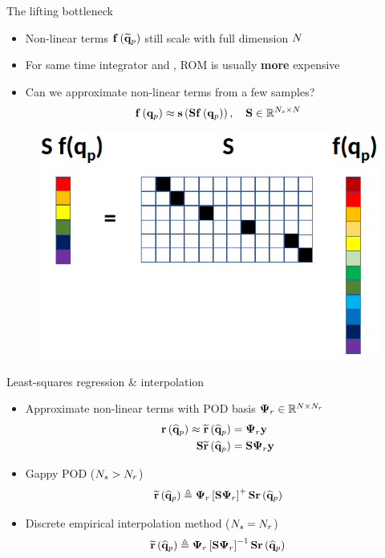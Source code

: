 \documentclass[]{beamer}
\begin{document}
\begin{frame}{The lifting bottleneck}
    \begin{itemize}
		\item Non-linear terms $\mathbf{f} \left(\mathbf{\widetilde{q}}_p\right)$ still scale with full dimension $N$
		\item For same time integrator and \dt, ROM is usually \textbf{more} expensive
		\item Can we approximate non-linear terms from a few samples?
		\begin{equation*}
			\mathbf{f} \left(\mathbf{q}_p\right) \approx \mathbf{s}\left(\mathbf{S} \mathbf{f} \left(\mathbf{q}_p\right)\right), \quad \mathbf{S} \in \mathbb{R}^{N_s \times N}
		\end{equation*}
	\end{itemize}
	\vspace{1em}
	\begin{figure}
		\centering
		\includegraphics[width=0.55\linewidth]{samplingHelperVis.png}
	\end{figure}
\end{frame}

\begin{frame}{Least-squares regression \& interpolation}
    \begin{itemize}
		\item Approximate non-linear terms with POD basis $\deimBasisRes \in \mathbb{R}^{\numDOF \times \numResModes}$
		\begin{align*}
			\resFunc{\primVecCoef} \approx \resApproxFunc{\primVecCoef} &= \deimBasisRes \dummyVec \\
			\sampMat \resApproxFunc{\primVecCoef} &= \sampMat \deimBasisRes \dummyVec
		\end{align*}
		\item Gappy POD ($N_s > N_r$)
		\begin{equation*}
			\resApproxFunc{\primVecCoef} \triangleq \deimBasisRes \left[ \sampMat \deimBasisRes \right]^{+} \sampMat \resFunc{\primVecCoef}
		\end{equation*}
		\item Discrete empirical interpolation method ($N_s = N_r$)
		\begin{equation*}
			\resApproxFunc{\primVecCoef} \triangleq \deimBasisRes \left[ \sampMat \deimBasisRes \right]^{-1} \sampMat \resFunc{\primVecCoef}
		\end{equation*}
	\end{itemize}
\end{frame}
\end{document}
